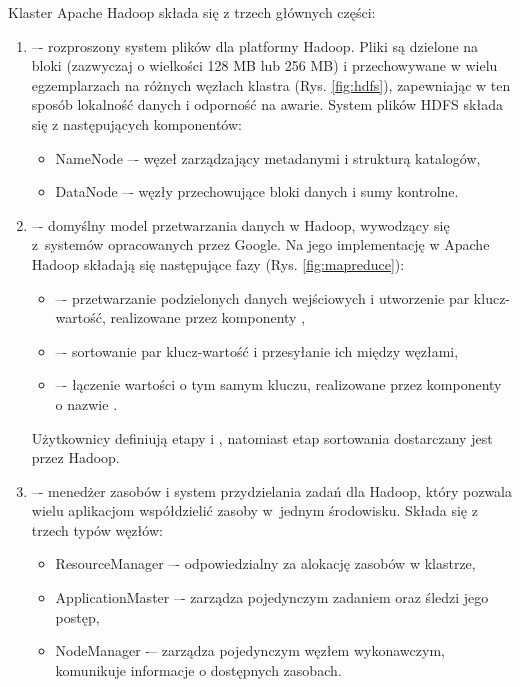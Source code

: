 Klaster Apache Hadoop składa się z trzech głównych części:
\begin{enumerate}
      \item {} –- rozproszony system plików dla
            platformy Hadoop. Pliki są dzielone na bloki (zazwyczaj o wielkości 128 MB lub 256 MB)
            i przechowywane w wielu egzemplarzach na różnych węzłach klastra (Rys. \ref{fig:hdfs}),
            zapewniając w ten sposób lokalność danych i odporność na awarie. System plików HDFS
            składa się z następujących komponentów:
            \begin{itemize}
                  \item NameNode –- węzeł zarządzający metadanymi i strukturą katalogów,
                  \item DataNode –- węzły przechowujące bloki danych i sumy kontrolne.
            \end{itemize}
      \item {} –- domyślny model przetwarzania danych w Hadoop, wywodzący się
            z~systemów opracowanych przez Google. Na jego implementację w Apache Hadoop składają
            się następujące fazy (Rys. \ref{fig:mapreduce}):
            \begin{itemize}
                  \item {} –- przetwarzanie podzielonych danych wejściowych i utworzenie
                        par klucz-wartość, realizowane przez komponenty ,
                  \item {} –- sortowanie par klucz-wartość i przesyłanie ich między węzłami,
                  \item {} –- łączenie wartości o tym samym kluczu, realizowane przez
                        komponenty o nazwie .
            \end{itemize}
            Użytkownicy definiują etapy  i , natomiast etap sortowania
            dostarczany jest przez Hadoop.
      \item {} –- menedżer zasobów i system przydzielania
            zadań dla Hadoop, który pozwala wielu aplikacjom współdzielić zasoby w~jednym środowisku.
            Składa się z trzech typów węzłów:
            \begin{itemize}
                  \item ResourceManager –- odpowiedzialny za alokację zasobów w klastrze,
                  \item ApplicationMaster –- zarządza pojedynczym zadaniem oraz śledzi jego postęp,
                  \item NodeManager -– zarządza pojedynczym węzłem wykonawczym, komunikuje informacje
                        o dostępnych zasobach.
            \end{itemize}
\end{enumerate}

